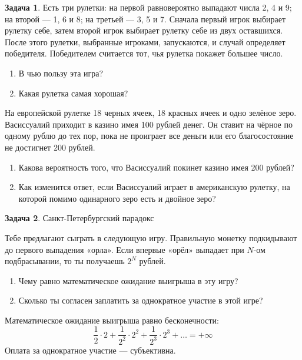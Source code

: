 \documentclass[nobib]{tufte-handout}
\theoremstyle{definition}
\newtheorem{problem}{Задача}
\begin{document}
\begin{problem}
Есть три рулетки:  на первой равновероятно выпадают числа 2, 4 и 9; на второй — 1, 6 и 8; на третьей — 3, 5 и 7. Сначала первый игрок выбирает рулетку себе, затем второй игрок выбирает рулетку себе из двух оставшихся. После этого рулетки, выбранные игроками, запускаются, и случай определяет победителя. Победителем считается тот, чья рулетка покажет большее число. 

\begin{enumerate}
\item В чью пользу эта игра?
\item Какая рулетка самая хорошая?
\end{enumerate}

\item На европейской рулетке 18 черных ячеек, 18 красных ячеек и одно зелёное зеро. Васиссуалий приходит в казино имея 100 рублей денег. Он ставит на чёрное по одному рублю до тех пор, пока не проиграет все деньги или его благосостояние не достигнет 200 рублей.

\begin{enumerate}
\item Какова вероятность того, что Васиссуалий покинет казино имея 200 рублей?
\item Как изменится ответ, если Васиссуалий играет в американскую рулетку, на которой помимо одинарного зеро есть и двойное зеро?
\end{enumerate}

\end{problem}


\begin{problem}
Санкт-Петербургский парадокс

Тебе предлагают сыграть в следующую игру. Правильную монетку подкидывают до первого выпадения «орла». Если впервые «орёл» выпадает при $N$-ом подбрасывании, то ты получаешь $2^N$ рублей.

\begin{enumerate}
\item Чему равно математическое ожидание выигрыша в эту игру?
\item Сколько ты согласен заплатить за однократное участие в этой игре?
\end{enumerate}

\begin{sol}
Математическое ожидание выигрыша равно бесконечности:
\[
\frac{1}{2}\cdot 2 + \frac{1}{2^2}\cdot 2^2 + \frac{1}{2^3}\cdot 2^3 + \ldots = +\infty
\]
Оплата за однократное участие — субъективна.
\end{sol}

\end{problem}
\end{document}
